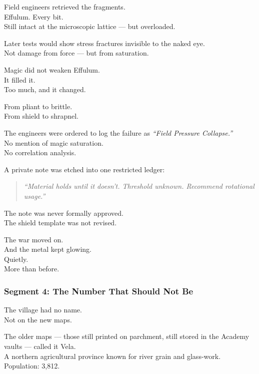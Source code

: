 \documentclass[9pt]{article}
\begin{document}
\vspace{1em}

Field engineers retrieved the fragments.\\
Effulum. Every bit.\\
Still intact at the microscopic lattice — but overloaded.

Later tests would show stress fractures invisible to the naked eye.\\
Not damage from force — but from saturation.

\vspace{1em}

Magic did not weaken Effulum.\\
It filled it.\\
Too much, and it changed.

From pliant to brittle.\\
From shield to shrapnel.

\vspace{1em}

The engineers were ordered to log the failure as \textit{“Field Pressure Collapse.”}\\
No mention of magic saturation.\\
No correlation analysis.

A private note was etched into one restricted ledger:

\begin{quote}
\textit{“Material holds until it doesn’t. Threshold unknown. Recommend rotational usage.”}
\end{quote}

The note was never formally approved.\\
The shield template was not revised.

\vspace{1em}

The war moved on.\\
And the metal kept glowing.\\
Quietly.\\
More than before.

\newpage

\subsubsection*{Segment 4: The Number That Should Not Be}

The village had no name.\\
Not on the new maps.

The older maps — those still printed on parchment, still stored in the Academy vaults — called it Vela.\\
A northern agricultural province known for river grain and glass-work.\\
Population: 3,812.
\end{document}
